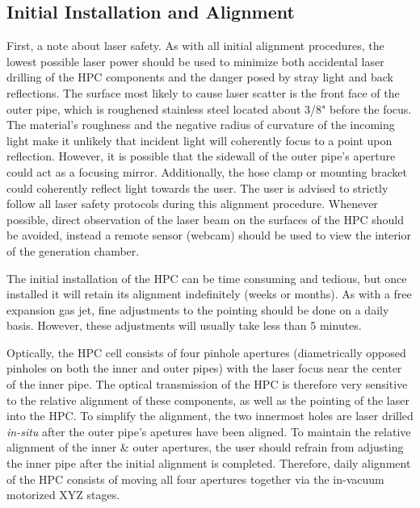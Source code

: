\subsection{Initial Installation and Alignment}
\label{app:initial-alignment-HPC}
First, a note about laser safety. As with all initial alignment procedures, the lowest possible laser power should be used to minimize both accidental laser drilling of the HPC components and the danger posed by stray light and back reflections. The surface most likely to cause laser scatter is the front face of the outer pipe, which is roughened stainless steel located about 3/8" before the focus. The material's roughness and the negative radius of curvature of the incoming light make it unlikely that incident light will coherently focus to a point upon reflection. However, it is possible that the sidewall of the outer pipe's aperture could act as a focusing mirror. Additionally, the hose clamp or mounting bracket could coherently reflect light towards the user. The user is advised to strictly follow all laser safety protocols during this alignment procedure. Whenever possible, direct observation of the laser beam on the surfaces of the HPC should be avoided, instead a remote sensor (webcam) should be used to view the interior of the generation chamber.

The initial installation of the HPC can be time consuming and tedious, but once installed it will retain its alignment indefinitely (weeks or months). As with a free expansion gas jet, fine adjustments to the pointing should be done on a daily basis. However, these adjustments will usually take less than 5 minutes.

Optically, the HPC cell consists of four pinhole apertures (diametrically opposed pinholes on both the inner and outer pipes) with the laser focus near the center of the inner pipe. The optical transmission of the HPC is therefore very sensitive to the relative alignment of these components, as well as the pointing of the laser into the HPC. To simplify the alignment, the two innermost holes are laser drilled \textit{in-situ} after the outer pipe's apetures have been aligned. To maintain the relative alignment of the inner \& outer apertures, the user should refrain from adjusting the inner pipe after the initial alignment is completed. Therefore, daily alignment of the HPC consists of moving all four apertures together via the in-vacuum motorized XYZ stages.

